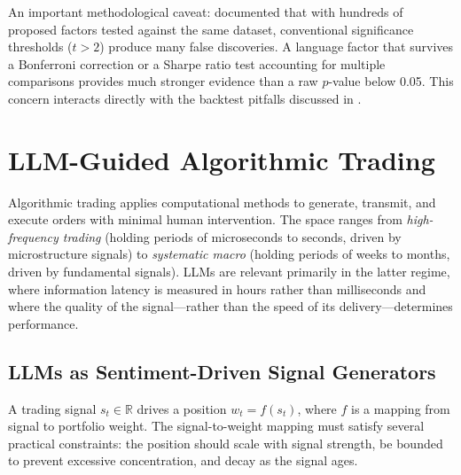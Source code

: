 An important methodological caveat: \citet{harvey2016cross} documented that with hundreds
of proposed factors tested against the same dataset, conventional significance thresholds
($t > 2$) produce many false discoveries. A language factor that survives a Bonferroni
correction or a Sharpe ratio test accounting for multiple comparisons provides much stronger
evidence than a raw $p$-value below 0.05. This concern interacts directly with the backtest
pitfalls discussed in .

\section{LLM-Guided Algorithmic Trading}
\label{sec:ch10-llm-algorithmic-trading}

Algorithmic trading applies computational methods to generate, transmit, and execute
orders with minimal human intervention. The space ranges from \emph{high-frequency
trading} (holding periods of microseconds to seconds, driven by microstructure signals)
to \emph{systematic macro} (holding periods of weeks to months, driven by fundamental
signals). LLMs are relevant primarily in the latter regime, where information latency is
measured in hours rather than milliseconds and where the quality of the signal---rather
than the speed of its delivery---determines performance.

\subsection{LLMs as Sentiment-Driven Signal Generators}
\label{sec:ch10-sentiment-signals}

A trading signal $s_t \in \mathbb{R}$ drives a position $w_t = f(s_t)$, where $f$
is a mapping from signal to portfolio weight. The signal-to-weight mapping must satisfy
several practical constraints: the position should scale with signal strength, be bounded
to prevent excessive concentration, and decay as the signal ages.

